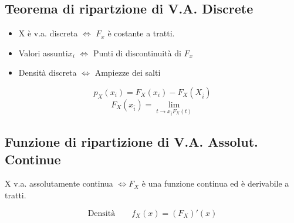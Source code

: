 \subsection*{Teorema di ripartzione di V.A. Discrete}
\begin{itemize}
	\item X è v.a. discreta $\Leftrightarrow$ $F_x$ è costante a tratti.
	\item Valori assunti{$x_i$} $\Leftrightarrow$ Punti di discontinuità  di $F_x$
	\item Densità discreta $\Leftrightarrow$ Ampiezze dei salti
\end{itemize}
\begin{equation*}
	p_X (x_i) = F_X(x_i) - F_X(X_{\bar{i}})
\end{equation*}
\begin{equation*}
	F_X(x_{\bar{i}}) = \lim_{t \to x_{\bar{i}} F_X(t)}
\end{equation*}
\subsection*{Funzione di ripartizione di V.A. Assolut. Continue}
X v.a. assolutamente continua $\Leftrightarrow F_X$ è una funzione continua ed
è derivabile a tratti.

\begin{equation}
	\text{Densità} \qquad f_X(x) = (F_X)'(x)
\end{equation}

